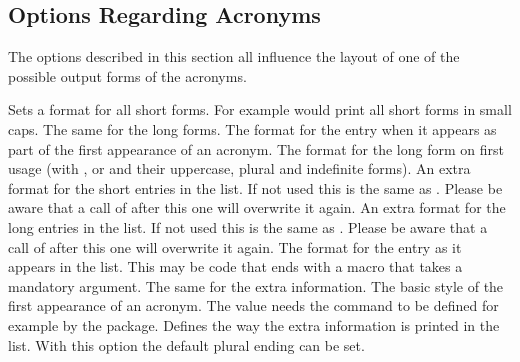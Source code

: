 \documentclass[load-preamble+]{cnltx-doc}
\begin{document}
\subsection{Options Regarding Acronyms}
The options described in this section all influence the layout of one of the
possible output forms of the acronyms.
\begin{options}
  \Default
    Sets a format for all short forms. For example
     would print all short forms in small
    caps.
  \Default
    The same for the long forms.
  \Default
    The format for the  entry when it appears as part of the
    first appearance of an acronym.
  \Default
    The format for the long form on first usage (with ,  or
     and their uppercase, plural and indefinite forms).
  \Default
    An extra format for the short entries in the list.  If
    not used this is the same as .  Please be aware that
    a call of  after this one will overwrite it again.
  \Default
    An extra format for the long entries in the list.  If not used this is the
    same as .  Please be aware that a call of
     after this one will overwrite it again.
    \label{key:list-foreign-format}The format for the  entry
    as it appears in the list.  This may be code that ends with a macro that
    takes a mandatory argument.
  \Default
    The same for the extra information.
    The basic style of the first appearance of an
    acronym.  The value  needs the command  to be
    defined for example by the  package.
    Defines the way the extra information is printed in the list.
    With this option the default plural ending can be set.
\end{options}
 
\end{document}
